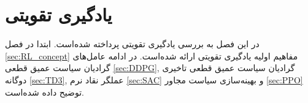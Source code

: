 \chapter{یادگیری تقویتی}
در این فصل به بررسی یادگیری تقویتی پرداخته شده‌است. ابتدا در فصل
\ref{sec:RL_concept}
مفاهیم اولیه یادگیری تقویتی ارائه شده‌است. در ادامه عامل‌های گرادیان سیاست عمیق قطعی
\ref{sec:DDPG},
گرادیان سیاست عمیق قطعی تاخیری دوگانه
\ref{sec:TD3},
عملگر نقاد نرم
\ref{sec:SAC}
و
بهینه‌سازی سیاست مجاور
\ref{sec:PPO}
توضیح داده شده‌است.




